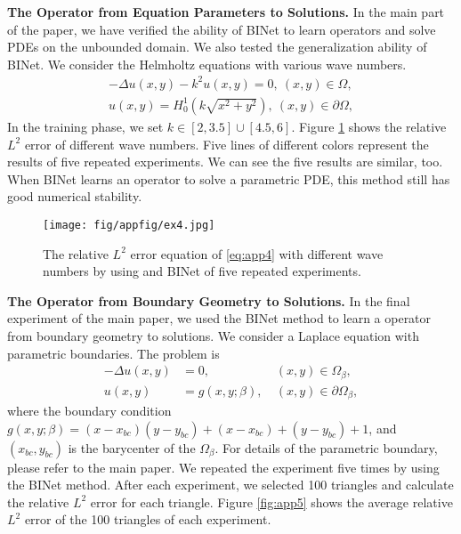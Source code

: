 \documentclass[hyperref]{article}
\numberwithin{equation}{section}
\theoremstyle{nonumberplain}
\begin{document}
	
	\noindent \textbf{The Operator from Equation Parameters to Solutions.} In the main part of the paper, we have verified the ability of BINet to learn operators and solve PDEs on the unbounded domain. We also tested the generalization ability of BINet. We consider the Helmholtz equations with various wave numbers.
	\begin{equation}
		\begin{aligned}
			-\Delta u(x,y) - k^2u(x,y) = 0,\ (x,y)\in\Omega,\\
			u(x,y) = H_0^1(k\sqrt{x^2+y^2}), \ (x,y)\in\partial\Omega,
		\end{aligned}
		\label{eq:app4}
	\end{equation}
	In the training phase, we set $k\in[2,3.5]\cup[4.5,6]$.
	Figure \ref{fig:app4} shows the relative $L^2$ error of different wave numbers. Five lines of different colors represent the results of five repeated experiments. We can see the five results are similar, too. When BINet learns an operator to solve a parametric PDE, this method still has good numerical stability. 
	
	\begin{figure}[t]
		\centering
		\centering
		\texttt{[image: fig/appfig/ex4.jpg]}
		\centering
		\caption{The relative $L^2$ error equation of \eqref{eq:app4} with different wave numbers by using and BINet of five repeated experiments.}
		\label{fig:app4}
	\end{figure}
	
	
	\noindent \textbf{The Operator from Boundary Geometry to Solutions.} In the final experiment of the main paper, we used the BINet method to learn a operator from boundary  geometry to solutions. We consider a Laplace equation with parametric boundaries. The problem is 
	\begin{equation}
		\begin{aligned}
			-\Delta u(x,y) & = 0, \ &(x,y)\in\Omega_\beta,\\
			u(x,y) &= g(x,y;\beta), \ &(x,y)\in\partial\Omega_\beta,
		\end{aligned}
		\label{eq:ex5_app}
	\end{equation}
	where the boundary condition $g(x,y;\beta)=(x-x_{bc})(y-y_{bc})+(x-x_{bc})+(y-y_{bc})+1$, and $(x_{bc},y_{bc})$ is the barycenter of the $\Omega_\beta$. For details of the parametric boundary, please refer to the main paper. We repeated the experiment five times by using the BINet method. After each experiment, we selected 100 triangles and calculate the relative $L^2$ error for each triangle. Figure \ref{fig:app5} shows the average relative $L^2$ error of the 100 triangles of each experiment.   
	
\end{document}
